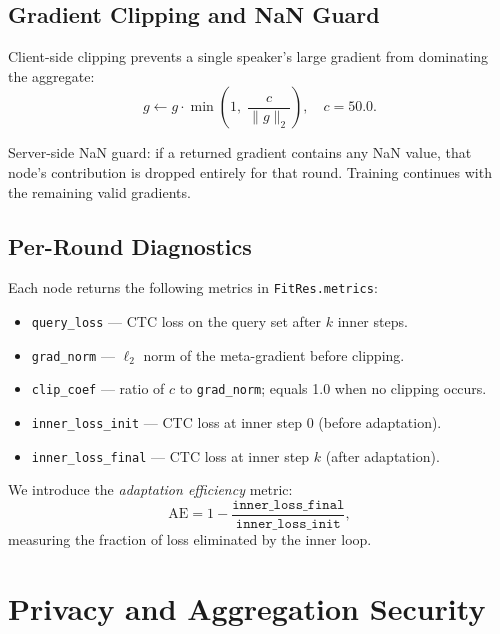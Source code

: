 \documentclass[12pt]{article}
\theoremstyle{plain}
\begin{document}
\subsection{Gradient Clipping and NaN Guard}

Client-side clipping prevents a single speaker's large gradient from dominating
the aggregate:
\begin{equation}
  g \leftarrow g \cdot \min\!\left(1,\; \frac{c}{\|g\|_2}\right), \quad c = 50.0.
\end{equation}

Server-side NaN guard: if a returned gradient contains any NaN value, that
node's contribution is dropped entirely for that round.
Training continues with the remaining valid gradients.

\subsection{Per-Round Diagnostics}

Each node returns the following metrics in \verb|FitRes.metrics|:

\begin{itemize}
  \item \texttt{query\_loss} --- CTC loss on the query set after $k$ inner steps.
  \item \texttt{grad\_norm} --- $\ell_2$ norm of the meta-gradient before clipping.
  \item \texttt{clip\_coef} --- ratio of $c$ to \texttt{grad\_norm};
        equals 1.0 when no clipping occurs.
  \item \texttt{inner\_loss\_init} --- CTC loss at inner step 0 (before adaptation).
  \item \texttt{inner\_loss\_final} --- CTC loss at inner step $k$ (after adaptation).
\end{itemize}

We introduce the \emph{adaptation efficiency} metric:
\begin{equation}
  \mathrm{AE} = 1 - \frac{\texttt{inner\_loss\_final}}{\texttt{inner\_loss\_init}},
\end{equation}
measuring the fraction of loss eliminated by the inner loop.

\section{Privacy and Aggregation Security}
\label{sec:security}
\end{document}
